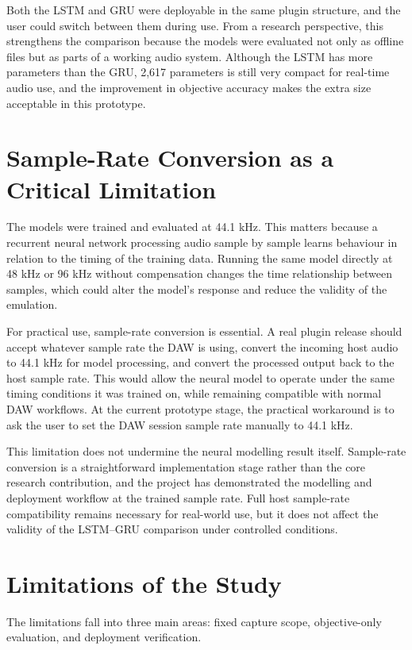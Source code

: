 Both the LSTM and GRU were deployable in the same plugin structure, and the user could switch between them during use. From a research perspective, this strengthens the comparison because the models were evaluated not only as offline files but as parts of a working audio system. Although the LSTM has more parameters than the GRU, 2,617 parameters is still very compact for real-time audio use, and the improvement in objective accuracy makes the extra size acceptable in this prototype.

\section{Sample-Rate Conversion as a Critical Limitation}

The models were trained and evaluated at 44.1 kHz. This matters because a recurrent neural network processing audio sample by sample learns behaviour in relation to the timing of the training data. Running the same model directly at 48 kHz or 96 kHz without compensation changes the time relationship between samples, which could alter the model's response and reduce the validity of the emulation.

For practical use, sample-rate conversion is essential. A real plugin release should accept whatever sample rate the DAW is using, convert the incoming host audio to 44.1 kHz for model processing, and convert the processed output back to the host sample rate. This would allow the neural model to operate under the same timing conditions it was trained on, while remaining compatible with normal DAW workflows. At the current prototype stage, the practical workaround is to ask the user to set the DAW session sample rate manually to 44.1 kHz.

This limitation does not undermine the neural modelling result itself. Sample-rate conversion is a straightforward implementation stage rather than the core research contribution, and the project has demonstrated the modelling and deployment workflow at the trained sample rate. Full host sample-rate compatibility remains necessary for real-world use, but it does not affect the validity of the LSTM--GRU comparison under controlled conditions.

\section{Limitations of the Study}

The limitations fall into three main areas: fixed capture scope, objective-only evaluation, and deployment verification.

